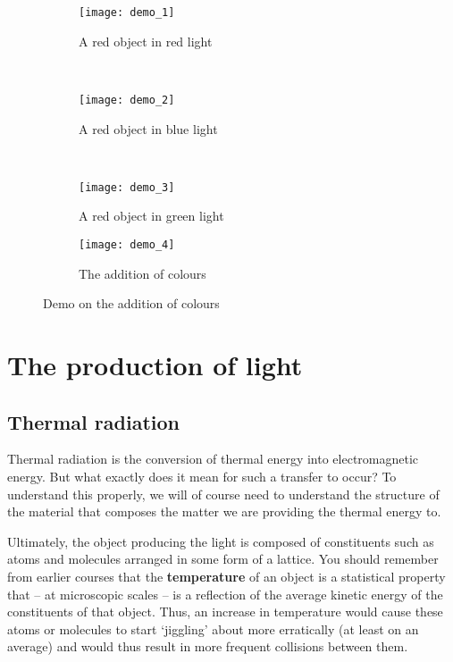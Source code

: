 \begin{figure}[!htb]
\centering
    \begin{subfigure}[b]{0.3\textwidth}
        \texttt{[image: demo\_1]}
        \caption{A red object in red light}
        \label{img_color_demo_1}
    \end{subfigure}
    ~ %
    \begin{subfigure}[b]{0.3\textwidth}
        \texttt{[image: demo\_2]}
        \caption{A red object in blue light}
        \label{img_color_demo_2}
    \end{subfigure}
    ~ %
    \begin{subfigure}[b]{0.3\textwidth}
        \texttt{[image: demo\_3]}
        \caption{A red object in green light}
        \label{img_color_demo_3}
    \end{subfigure}
    
    \begin{subfigure}[b]{0.3\textwidth}
        \texttt{[image: demo\_4]}
        \caption{The addition of colours}
        \label{img_color_demo_3}
    \end{subfigure}
    \caption{Demo on the addition of colours}\label{fig:animals}
\end{figure}

\section{The production of light}

\subsection{Thermal radiation}

Thermal radiation is the conversion of thermal energy into electromagnetic energy. But what exactly does it mean for such a transfer to occur? To understand this properly, we will of course need to understand the structure of the material that composes the matter we are providing the thermal energy to. 

Ultimately, the object producing the light is composed of constituents such as atoms and molecules arranged in some form of a lattice. You should remember from earlier courses that the \textbf{temperature} of an object is a statistical property that -- at microscopic scales -- is a reflection of the average kinetic energy of the constituents of that object. Thus, an increase in temperature would cause these atoms or molecules to start `jiggling' about more erratically (at least on an average) and would thus result in more frequent collisions between them.  

